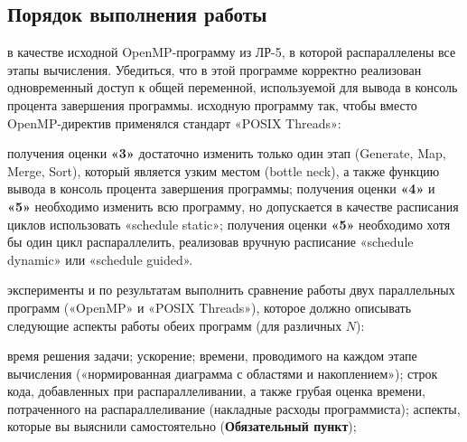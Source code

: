 { %
	\subsection{Порядок выполнения работы}
	\begin{enumerate}
		 в качестве исходной OpenMP-программу из ЛР-5, в которой распараллелены все этапы вычисления. Убедиться, что в этой программе корректно реализован одновременный доступ к общей переменной, используемой для вывода в консоль процента завершения программы.
		 исходную программу так, чтобы вместо OpenMP-директив применялся стандарт «POSIX Threads»:
			\begin{itemize}
				 получения оценки \textbf{«3»} достаточно изменить только один этап (Generate, Map, Merge, Sort), который является узким местом (bottle neck), а также функцию вывода в консоль процента завершения программы;
				 получения оценки \textbf{«4»} и \textbf{«5»} необходимо изменить всю программу, но допускается в качестве расписания циклов использовать «schedule static»;
				 получения оценки \textbf{«5»} необходимо хотя бы один цикл распараллелить, реализовав вручную расписание «schedule dynamic» или «schedule guided».
			\end{itemize}
		 эксперименты и по результатам выполнить сравнение работы двух параллельных программ («OpenMP» и «POSIX Threads»), которое должно описывать следующие аспекты работы обеих программ (для различных $N$):
			\begin{itemize}
				 время решения задачи;
				\itemпараллельное ускорение;
				 времени, проводимого на каждом этапе вычисления («нормированная
диаграмма с областями и накоплением»);
				 строк кода, добавленных при распараллеливании, а также грубая оценка
времени, потраченного на распараллеливание (накладные расходы программиста);
				 аспекты, которые вы выяснили самостоятельно (\textbf{Обязательный пункт});
			\end{itemize}
	\end{enumerate}
}